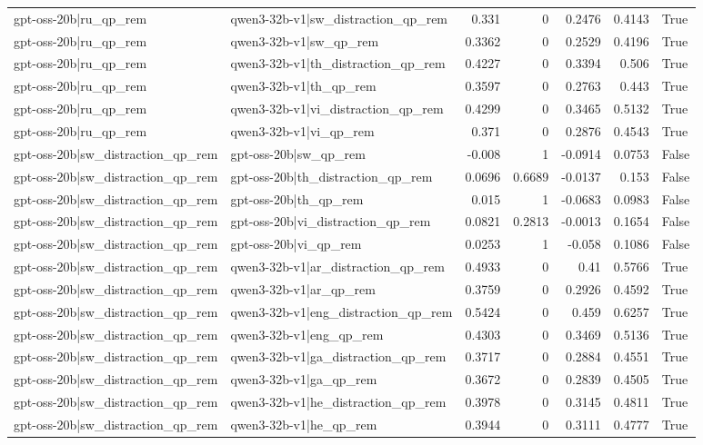 \begin{table}
\begin{tabular}{l l r r r r l}
gpt-oss-20b|ru_qp_rem & qwen3-32b-v1|sw_distraction_qp_rem & 0.331 & 0 & 0.2476 & 0.4143 & True \\
gpt-oss-20b|ru_qp_rem & qwen3-32b-v1|sw_qp_rem & 0.3362 & 0 & 0.2529 & 0.4196 & True \\
gpt-oss-20b|ru_qp_rem & qwen3-32b-v1|th_distraction_qp_rem & 0.4227 & 0 & 0.3394 & 0.506 & True \\
gpt-oss-20b|ru_qp_rem & qwen3-32b-v1|th_qp_rem & 0.3597 & 0 & 0.2763 & 0.443 & True \\
gpt-oss-20b|ru_qp_rem & qwen3-32b-v1|vi_distraction_qp_rem & 0.4299 & 0 & 0.3465 & 0.5132 & True \\
gpt-oss-20b|ru_qp_rem & qwen3-32b-v1|vi_qp_rem & 0.371 & 0 & 0.2876 & 0.4543 & True \\
gpt-oss-20b|sw_distraction_qp_rem & gpt-oss-20b|sw_qp_rem & -0.008 & 1 & -0.0914 & 0.0753 & False \\
gpt-oss-20b|sw_distraction_qp_rem & gpt-oss-20b|th_distraction_qp_rem & 0.0696 & 0.6689 & -0.0137 & 0.153 & False \\
gpt-oss-20b|sw_distraction_qp_rem & gpt-oss-20b|th_qp_rem & 0.015 & 1 & -0.0683 & 0.0983 & False \\
gpt-oss-20b|sw_distraction_qp_rem & gpt-oss-20b|vi_distraction_qp_rem & 0.0821 & 0.2813 & -0.0013 & 0.1654 & False \\
gpt-oss-20b|sw_distraction_qp_rem & gpt-oss-20b|vi_qp_rem & 0.0253 & 1 & -0.058 & 0.1086 & False \\
gpt-oss-20b|sw_distraction_qp_rem & qwen3-32b-v1|ar_distraction_qp_rem & 0.4933 & 0 & 0.41 & 0.5766 & True \\
gpt-oss-20b|sw_distraction_qp_rem & qwen3-32b-v1|ar_qp_rem & 0.3759 & 0 & 0.2926 & 0.4592 & True \\
gpt-oss-20b|sw_distraction_qp_rem & qwen3-32b-v1|eng_distraction_qp_rem & 0.5424 & 0 & 0.459 & 0.6257 & True \\
gpt-oss-20b|sw_distraction_qp_rem & qwen3-32b-v1|eng_qp_rem & 0.4303 & 0 & 0.3469 & 0.5136 & True \\
gpt-oss-20b|sw_distraction_qp_rem & qwen3-32b-v1|ga_distraction_qp_rem & 0.3717 & 0 & 0.2884 & 0.4551 & True \\
gpt-oss-20b|sw_distraction_qp_rem & qwen3-32b-v1|ga_qp_rem & 0.3672 & 0 & 0.2839 & 0.4505 & True \\
gpt-oss-20b|sw_distraction_qp_rem & qwen3-32b-v1|he_distraction_qp_rem & 0.3978 & 0 & 0.3145 & 0.4811 & True \\
gpt-oss-20b|sw_distraction_qp_rem & qwen3-32b-v1|he_qp_rem & 0.3944 & 0 & 0.3111 & 0.4777 & True \\

\end{tabular}
\end{table}
